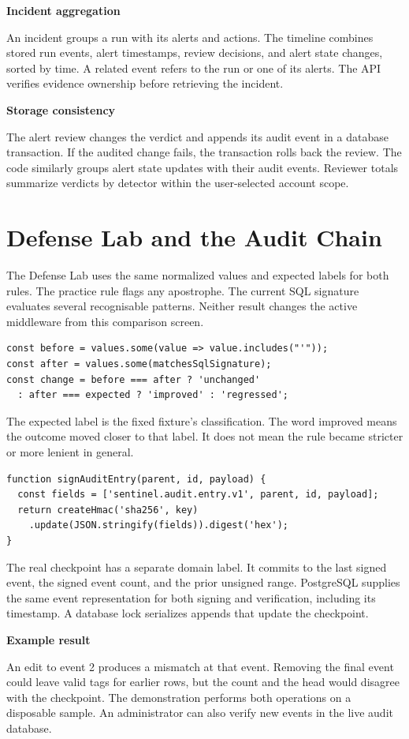 \documentclass[11pt,letterpaper,oneside]{report}
\newcommand{\topic}[1]{\smallskip\noindent\textbf{#1}\par\nobreak\vspace{-.39em}}
\newcommand{\sheet}[1]{\clearpage\section{#1}}
\begin{document}
\topic{Incident aggregation}
An incident groups a run with its alerts and actions. The timeline combines stored run events, alert timestamps, review decisions, and alert state changes, sorted by time. A related event refers to the run or one of its alerts. The API verifies evidence ownership before retrieving the incident.

\topic{Storage consistency}
The alert review changes the verdict and appends its audit event in a database transaction. If the audited change fails, the transaction rolls back the review. The code similarly groups alert state updates with their audit events. Reviewer totals summarize verdicts by detector within the user-selected account scope.

\sheet{Defense Lab and the Audit Chain}
The Defense Lab uses the same normalized values and expected labels for both rules. The practice rule flags any apostrophe. The current SQL signature evaluates several recognisable patterns. Neither result changes the active middleware from this comparison screen.

\begin{lstlisting}[caption={Adapted comparison logic from server/ruleComparison.ts}]
const before = values.some(value => value.includes("'"));
const after = values.some(matchesSqlSignature);
const change = before === after ? 'unchanged'
  : after === expected ? 'improved' : 'regressed';
\end{lstlisting}

The expected label is the fixed fixture's classification. The word improved means the outcome moved closer to that label. It does not mean the rule became stricter or more lenient in general.

\begin{lstlisting}[caption={Adapted audit tag construction from server/auditIntegrity.ts}]
function signAuditEntry(parent, id, payload) {
  const fields = ['sentinel.audit.entry.v1', parent, id, payload];
  return createHmac('sha256', key)
    .update(JSON.stringify(fields)).digest('hex');
}
\end{lstlisting}

The real checkpoint has a separate domain label. It commits to the last signed event, the signed event count, and the prior unsigned range. PostgreSQL supplies the same event representation for both signing and verification, including its timestamp. A database lock serializes appends that update the checkpoint.

\topic{Example result}
An edit to event 2 produces a mismatch at that event. Removing the final event could leave valid tags for earlier rows, but the count and the head would disagree with the checkpoint. The demonstration performs both operations on a disposable sample. An administrator can also verify new events in the live audit database.
\end{document}
